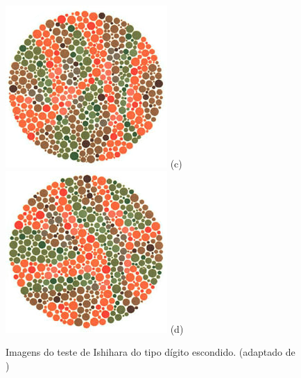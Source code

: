 \documentclass[	12pt, Times, openright, twoside, a4paper, english, brazil]{abntex2}
\begin{document}
\begin{apendicesenv}
\begin{figure}[!htb]
\centering
{\includegraphics[width=\linewidth]{ishihara-digitoescondido/plate20.png}}
(c)
\endminipage\hfill
{}
\centering
{\includegraphics[width=\linewidth]{ishihara-digitoescondido/plate21.png}}
(d)
\endminipage\hfill
\caption{Imagens do teste de Ishihara do tipo dígito escondido. (adaptado de )}
\label{fig:apendiceDigitoEscondido}
\end{figure}


\end{apendicesenv}
\end{document}
